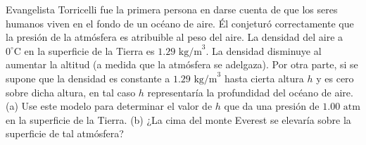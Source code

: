 \item Evangelista Torricelli fue la primera persona en darse cuenta de que los seres humanos viven en el fondo de un océano de aire. Él conjeturó correctamente que la presión de la atmósfera es atribuible al peso del aire. La densidad del aire a $0^\circ\text{C}$ en la superficie de la Tierra es $1.29 \text{ kg/m}^3$. La densidad disminuye al aumentar la altitud (a medida que la atmósfera se adelgaza). Por otra parte, si se supone que la densidad es constante a $1.29 \text{ kg/m}^3$ hasta cierta altura $h$ y es cero sobre dicha altura, en tal caso $h$ representaría la profundidad del océano de aire. (a) Use este modelo para determinar el valor de $h$ que da una presión de $1.00 \text{ atm}$ en la superficie de la Tierra. (b) ¿La cima del monte Everest se elevaría sobre la superficie de tal atmósfera?
